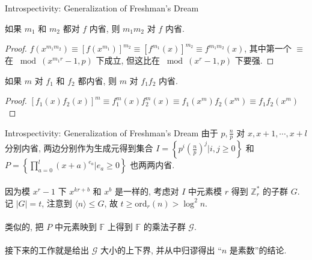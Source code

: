 \documentclass{beamer}
\def\le{\leqslant}
\def\ge{\geqslant}
\def\ord{\textrm{ord}}
\begin{document}
\begin{frame}{Introspectivity: Generalization of Freshman's Dream}
	
	\begin{lemma}[数乘封闭性]
		如果 $m_1$ 和 $m_2$ 都对 $f$ 内省, 则 $m_1m_2$ 对 $f$ 内省.
	\end{lemma}
	\begin{proof}
		$f(x^{m_1m_2}) \equiv [f(x^{m_1})]^{m_2} \equiv [f^{m_1}(x)]^{m_2} \equiv f^{m_1m_2}(x)$, 其中第一个 $\equiv$ 在 $\bmod (x^{m_1r} - 1, p)$ 下成立, 但这比在 $\bmod (x^{r} - 1, p)$ 下要强.
	\end{proof}
	\pause
	\begin{lemma}[多项式乘封闭性]
		如果 $m$ 对 $f_1$ 和 $f_2$ 都内省, 则 $m$ 对 $f_1f_2$ 内省.
	\end{lemma}
	\begin{proof}
		$[f_1(x)f_2(x)]^m \equiv f_1^m(x)f_2^m(x) \equiv f_1(x^m)f_2(x^m) \equiv f_1f_2(x^m)$
	\end{proof}
\end{frame}
\begin{frame}{Introspectivity: Generalization of Freshman's Dream}
	由于 $p, \frac np$ 对 $x, x + 1, \cdots, x + l$ 分别内省, 两边分别作为生成元得到集合 $I = \left\{p^i \left(\frac np\right)^j \bigg| i, j \ge 0\right\}$ 和 $P = \left\{\prod\limits_{a=0}^{l}(x + a)^{e_a} \bigg| e_a \ge 0\right\}$ 也两两内省. \\~\\

	因为模 $x^r - 1$ 下 $x^{kr + b}$ 和 $x^b$ 是一样的, 考虑对 $I$ 中元素模 $r$ 得到 $\mathbb Z_r^*$ 的子群 $G$. 记 $|G| = t$, 注意到 $\langle n \rangle \le G$, 故 $t \ge \ord_r(n) > \log^2n$.\\~\\

	类似的, 把 $P$ 中元素映到 $\mathbb F$ 上得到 $\mathbb F$ 的乘法子群 $\mathcal G$. \\~\\

	接下来的工作就是给出 $\mathcal G$ 大小的上下界, 并从中归谬得出 “$n$ 是素数”的结论.
\end{frame}
\end{document}
